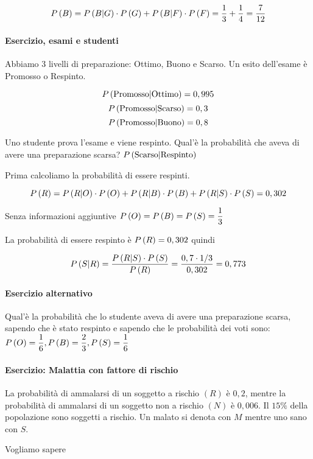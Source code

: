 \[ P\left(B\right) = P\left(B|G\right) \cdot P\left(G\right) + P\left(B|F\right) \cdot P\left(F\right) = \dfrac{1}{3} + \dfrac{1}{4} = \dfrac{7}{12} \]

\paragraph{Esercizio, esami e studenti}

Abbiamo 3 livelli di preparazione: Ottimo, Buono e Scarso.
Un esito dell'esame è Promosso o Respinto.

\[ P\left(\text{Promosso} | \text{Ottimo}\right) = 0,995\]
\[ P\left(\text{Promosso} | \text{Scarso}\right) = 0,3\]
\[ P\left(\text{Promosso} | \text{Buono}\right) = 0,8\]

Uno studente prova l'esame e viene respinto. Qual'è la probabilità che aveva di avere una preparazione scarsa? $ P\left(\text{Scarso}|\text{Respinto}\right) $

Prima calcoliamo la probabilità di essere respinti.

\[ P\left(R\right) = P\left(R|O\right) \cdot P\left(O\right) + P\left(R | B\right) \cdot P\left(B\right) + P\left(R|S\right) \cdot P\left(S\right) = 0,302 \]

Senza informazioni aggiuntive $ P\left(O\right) = P\left(B\right) = P\left(S\right) = \dfrac{1}{3} $

La probabilità di essere respinto è $ P\left(R\right) = 0,302 $ quindi 

\[ P\left(S | R\right) = \dfrac{P\left(R|S\right)\cdot P\left(S\right)}{P\left(R\right)} = \dfrac{0,7 \cdot 1/3}{0,302} = 0,773 \]

\paragraph{Esercizio alternativo}


Qual'è la probabilità che lo studente aveva di avere una preparazione scarsa, sapendo che è stato respinto e sapendo che le probabilità dei voti sono: $ P\left(O\right) = \dfrac{1}{6}, P\left(B\right) = \dfrac{2}{3}, P\left(S\right) = \dfrac{1}{6} $

\paragraph{Esercizio: Malattia con fattore di rischio}
La probabilità di ammalarsi di un soggetto a rischio $ (R) $ è $ 0,2 $, mentre la probabilità di ammalarsi di un soggetto non a rischio $ (N) $ è $ 0,006 $. Il $ 15\% $ della popolazione sono soggetti a rischio. Un malato si denota con $ M $ mentre uno sano con $ S $.

Vogliamo sapere 

